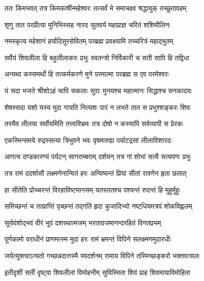\twolineshloka
{ततः किमभवत् तत्र किमकार्षीन्महेश्वरः}
{तत्सर्वं मे समाचक्ष्व श्रद्धायुक् तच्छुतावहम्} %


\twolineshloka
{शृणु तात परप्रीत्या मुनिभिस्सह नारद}
{सुतवर्य महाप्राज्ञ चरितं शशिमौलिनः} %

\twolineshloka
{नमस्कृत्य महेशानं हर्यादिसुरसेवितम्}
{परब्रह्म प्रवक्ष्यामि तच्चरित्रं महाद्भुतम्} %

\twolineshloka
{सर्वेयं शिवलीला हि बहुलीलाकरः प्रभुः}
{स्वतन्त्रो निर्विकारी च सती सापि हि तद्विधा} %

\twolineshloka
{अन्यथा कस्समर्थो हि तत्कर्मकरणे मुने}
{परमात्मा परब्रह्म स एव परमेश्वरः} %

\twolineshloka
{यं सदा भजते श्रीशोऽहं चापि सकलाः सुराः}
{मुनयश्च महात्मानः सिद्धाश्च सनकादयः} %

\twolineshloka
{शेषस्सदा यशो यस्य मुदा गायति नित्यशः}
{पारं न लभते तात स प्रभुश्शङ्करः शिवः} %

\twolineshloka
{तस्यैव लीलया सर्वोयमिति तत्त्वविभ्रमः}
{तत्र दोषो न कस्यापि सर्वव्यापी स प्रेरकः} %

\twolineshloka
{एकस्मिन्समये रुद्रस्सत्या त्रिभुवने भवः}
{वृषमारुह्य पर्याटद्रसां लीलाविशारदः} %

\twolineshloka
{आगत्य दण्डकारण्यं पर्यटन् सागराम्बराम्}
{दर्शयन् तत्र गां शोभां सत्यै सत्यपणः प्रभुः} %

\twolineshloka
{तत्र रामं ददर्शासौ लक्ष्मणेनान्वितं हरः}
{अन्विष्यन्तं प्रियां सीतां रावणेन हृता छलात्} %

\twolineshloka
{हा सीतेति प्रोच्चरन्तं विरहाविष्टमानसम्}
{यतस्ततश्च पश्यन्तं रुदन्तं हि मुहुर्मुहुः} %

\twolineshloka
{समिच्छन्तं च तत्प्राप्तिं पृच्छन्तं तद्गतिं हृदा}
{कुजादिभ्यो नष्टधियमत्रपं शोकविह्वलम्} %

\twolineshloka
{सूर्यवंशोद्भवं वीरं भूपं दशरथात्मजम्}
{भरताग्रजमानन्दरहितं विगतप्रभम्} %

\twolineshloka
{पूर्णकामो वराधीनं प्राणमत्स्म मुदा हरः}
{रामं भ्रमन्तं विपिने सलक्ष्मणमुदारधीः} %

\twolineshloka
{जयेत्युक्त्वाऽन्यतो गच्छन्नदात्तस्मै स्वदर्शनम्}
{रामाय विपिने तस्मिच्छङ्करो भक्तवत्सलः} %

\twolineshloka
{इतीदृशीं सतीं दृष्ट्वा शिवलीलां विमोहनीम्}
{सुविस्मिता शिवं प्राह शिवमायाविमोहिता} %


